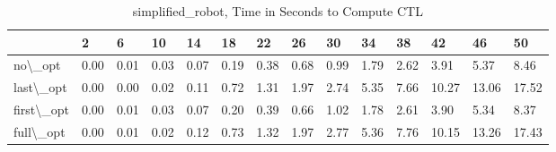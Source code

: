 \begin{table}
\centering
\caption{simplified\_robot, Time in Seconds to Compute CTL}
\label{simplified_robot_CTL_time}
\begin{tabular}{llllllllllllll}
\toprule
{} &     2 &     6 &    10 &    14 &    18 &    22 &    26 &    30 &    34 &    38 &     42 &     46 &     50 \\
\midrule
no\textbackslash \_opt    &  0.00 &  0.01 &  0.03 &  0.07 &  0.19 &  0.38 &  0.68 &  0.99 &  1.79 &  2.62 &   3.91 &   5.37 &   8.46 \\
last\textbackslash \_opt  &  0.00 &  0.00 &  0.02 &  0.11 &  0.72 &  1.31 &  1.97 &  2.74 &  5.35 &  7.66 &  10.27 &  13.06 &  17.52 \\
first\textbackslash \_opt &  0.00 &  0.01 &  0.03 &  0.07 &  0.20 &  0.39 &  0.66 &  1.02 &  1.78 &  2.61 &   3.90 &   5.34 &   8.37 \\
full\textbackslash \_opt  &  0.00 &  0.01 &  0.02 &  0.12 &  0.73 &  1.32 &  1.97 &  2.77 &  5.36 &  7.76 &  10.15 &  13.26 &  17.43 \\
\bottomrule
\end{tabular}
\end{table}

